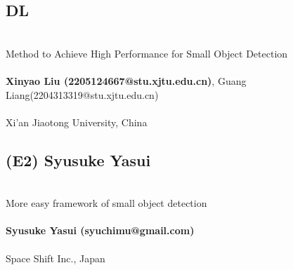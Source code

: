 \documentclass{mva_style}
\begin{document}
\subsection*{DL}
\\ Method to Achieve High Performance for Small Object Detection\\
\\ \textbf{Xinyao Liu (2205124667@stu.xjtu.edu.cn)}, Guang Liang(2204313319@stu.xjtu.edu.cn)\\
\\
 Xi'an Jiaotong University, China



\subsection*{(E2) Syusuke Yasui}
\\ More easy framework of small object detection\\
\\ \textbf{Syusuke Yasui (syuchimu@gmail.com)}\\
\\
 Space Shift Inc., Japan\\





\end{document}
